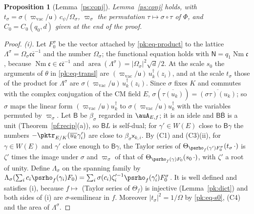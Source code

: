 \documentclass[10pt]{amsart}
\newtheorem{proposition}[theorem]{Proposition}
\theoremstyle{definition}
\theoremstyle{remark}
\providecommand{\auNm}{\operatorname{Nm}}
\providecommand{\auPl}{\Phi}
\providecommand{\aubar}[1]{\overline{#1}}
\begin{document}
\begin{proposition}[Lemma~\ref{ps:conj}]\label{pk:conj}
Lemma~\ref{ps:conj} holds, with
$t_\sigma=\sigma(\varpi_{\mathrm{vac}}/\mathsf u)\,c_\psi/\Omega_\sigma$, $\varpi_\sigma$ the
permutation $\tau\mapsto\sigma\circ\tau$ of $\auPl$, and $C_0=C_0(q_0,d)$ given at the end of the proof.
\end{proposition}
\begin{proof}
\emph{(i).} Let $F_0^\sigma$ be the vector attached by \eqref{pk:eq-product} to the lattice
$\Lambda^\sigma=\Omega_\sigma\mathfrak c\aubar{\mathfrak c}^{-1}$ and the number $\Omega_\sigma$; the
functional equation holds with $\mathsf N=q_1\auNm\mathfrak c$, because $\auNm\mathfrak c\in
\mathfrak c\aubar{\mathfrak c}^{-1}$ and $\operatorname{area}(\Lambda^\sigma)=|\Omega_\sigma|^2\sqrt
d/2$. At the scale $s_0$ the arguments of $\theta$ in \eqref{pk:eq-transl} are
$(\varpi_{\mathrm{vac}}/\mathsf u)\,u_k^\dagger(z_i)$, and at the scale $t_\sigma$ those of the
product for $\Lambda^\sigma$ are $\sigma(\varpi_{\mathrm{vac}}/\mathsf u)\,u_k^\dagger(z_i)$. Since
$\sigma$ fixes $K$ and commutes with the complex conjugation of the CM field $E$,
$\sigma(\aubar{\tau(u_k)})=\aubar{(\sigma\tau)(u_k)}$; so $\sigma$ maps the linear form
$(\varpi_{\mathrm{vac}}/\mathsf u)u_k^\dagger$ to $\sigma(\varpi_{\mathrm{vac}}/\mathsf u)u_k^\dagger$
with the variables permuted by $\varpi_\sigma$. Let $\mathsf B$ be $\beta_\sigma$ regarded in
$\auA_{E,f}$; it is an idele and $\mathsf B\aubar{\mathsf B}$ is a unit (Theorem~\ref{pf:recip}(a)), so
$\mathsf BL$ is self-dual; for $\gamma'\in W(E)$ close to $\mathsf B\gamma$ the numbers
$-\pktr_{E/K}(\aubar{u_k}\gamma'_i)$ are close to $\beta_\sigma\mathsf x_{k,i}$. By (C1) and
(C3)(ii), for $\gamma\in W(E)$ and $\gamma'$ close enough to $\mathsf B\gamma$, the Taylor series
of $\Theta_{\psrho_f(\gamma')F_0^\sigma}(t_\sigma\,\cdot)$ is $\zeta'$ times the image under
$\sigma$ and $\varpi_\sigma$ of that of $\Theta_{\psrho_f(\gamma)F_0}(s_0\,\cdot)$, with $\zeta'$ a
root of unity. Define $\Lambda_\sigma$ on the spanning family by $\Lambda_\sigma(\sum_ic_i
\psrho_f(\gamma_i)F_0)=\sum_i\sigma(c_i)\zeta_i'^{-1}\psrho_f(\gamma'_i)F_0^\sigma$. It is well
defined and satisfies (i), because $f\mapsto$ (Taylor series of $\Theta_f$) is injective
(Lemma~\ref{pk:dict}) and both sides of (i) are $\sigma$-semilinear in $f$. Moreover
$|t_\sigma|^2=1/\Omega$ by \eqref{pk:eq-s0}, (C4) and the area of $\Lambda^\sigma$.


\end{proof}
\end{document}
